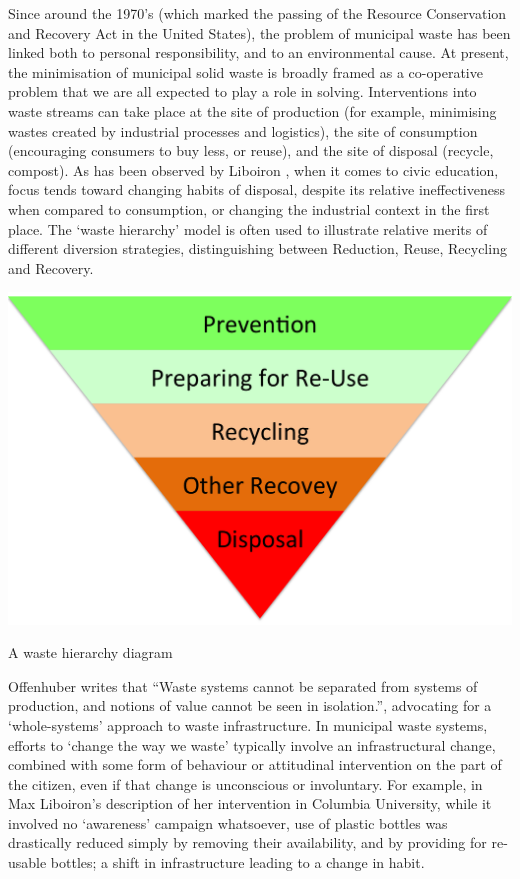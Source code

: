 \documentclass[nofonts,nols,justified,nobib]{tufte-book}
\begin{document}
Since around the 1970's (which marked the passing of the Resource Conservation and Recovery Act in the United States), the problem of municipal waste has been linked both to personal responsibility, and to an environmental cause. At present, the minimisation of municipal solid waste is broadly framed as a co-operative problem that we are all expected to play a role in solving. Interventions into waste streams can take place at the site of production (for example, minimising wastes created by industrial processes and logistics), the site of consumption (encouraging consumers to buy less, or reuse), and the site of disposal (recycle, compost). As has been observed by Liboiron \cite{liboiron_against_2014}, when it comes to civic education, focus tends toward changing habits of disposal, despite its relative ineffectiveness when compared to consumption, or changing the industrial context in the first place. The `waste hierarchy' model is often used to illustrate relative merits of different diversion strategies, distinguishing between Reduction, Reuse, Recycling and Recovery.


\begin{marginfigure}
\includegraphics[width=\textwidth]{img/1/waste-hierarchy.png}
\caption{A waste hierarchy diagram}
\end{marginfigure}

Offenhuber writes that ``Waste systems cannot be separated from systems of production, and notions of value cannot be seen in isolation.'', advocating for a `whole-systems' approach to waste infrastructure. In municipal waste systems, efforts to `change the way we waste' typically involve an infrastructural change, combined with some form of behaviour or attitudinal intervention on the part of the citizen, even if that change is unconscious or involuntary. For example, in Max Liboiron's description of her intervention in Columbia University, while it involved no `awareness' campaign whatsoever, use of plastic bottles was drastically reduced simply by removing their availability, and by providing for re-usable bottles; a shift in infrastructure leading to a change in habit. \cite{liboiron_against_2014}
\end{document}
